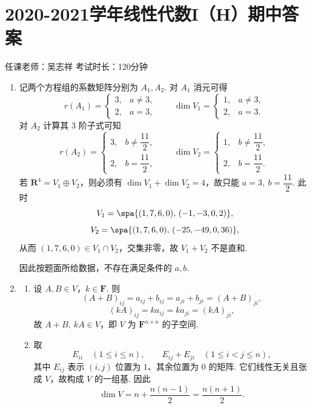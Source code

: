 \section{2020-2021学年线性代数I（H）期中答案}

\begin{center}
    任课老师：吴志祥\hspace{4em} 考试时长：120分钟
\end{center}
\begin{enumerate}
    \item 记两个方程组的系数矩阵分别为 $A_1,A_2$. 对 $A_1$ 消元可得
    \[
        r(A_1)=
        \begin{cases}
            3,&a\neq 3,\\
            2,&a=3,
        \end{cases}
        \qquad
        \dim V_1=
        \begin{cases}
            1,&a\neq 3,\\
            2,&a=3.
        \end{cases}
    \]
    对 $A_2$ 计算其 $3$ 阶子式可知
    \[
        r(A_2)=
        \begin{cases}
            3,&b\neq \dfrac{11}{2},\\[0.5pt]
            2,&b=\dfrac{11}{2},
        \end{cases}
        \qquad
        \dim V_2=
        \begin{cases}
            1,&b\neq \dfrac{11}{2},\\[0.5pt]
            2,&b=\dfrac{11}{2}.
        \end{cases}
    \]
    若 $\mathbf{R}^4=V_1\oplus V_2$，则必须有 $\dim V_1+\dim V_2=4$，故只能 $a=3,\ b=\dfrac{11}{2}$. 此时
    \[
        V_1=\spa\{(1,7,6,0),\,(-1,-3,0,2)\},
    \]
    \[
        V_2=\spa\{(1,7,6,0),\,(-25,-49,0,36)\},
    \]
    从而 $(1,7,6,0)\in V_1\cap V_2$，交集非零，故 $V_1+V_2$ 不是直和.

    因此按题面所给数据，不存在满足条件的 $a,b$.

    \item
    \begin{enumerate}
        \item 设 $A,B\in V$，$k\in\mathbf{F}$. 则
        \[
            (A+B)_{ij}=a_{ij}+b_{ij}=a_{ji}+b_{ji}=(A+B)_{ji},
        \]
        \[
            (kA)_{ij}=ka_{ij}=ka_{ji}=(kA)_{ji},
        \]
        故 $A+B,\ kA\in V$，即 $V$ 为 $\mathbf{F}^{n\times n}$ 的子空间.

        \item 取
        \[
            E_{ii}\quad(1\leqslant i\leqslant n),\qquad
            E_{ij}+E_{ji}\quad(1\leqslant i<j\leqslant n),
        \]
        其中 $E_{ij}$ 表示 $(i,j)$ 位置为 $1$、其余位置为 $0$ 的矩阵. 它们线性无关且张成 $V$，故构成 $V$ 的一组基. 因此
        \[
            \dim V=n+\frac{n(n-1)}{2}=\frac{n(n+1)}{2}.
        \]
    \end{enumerate}


\end{enumerate}
